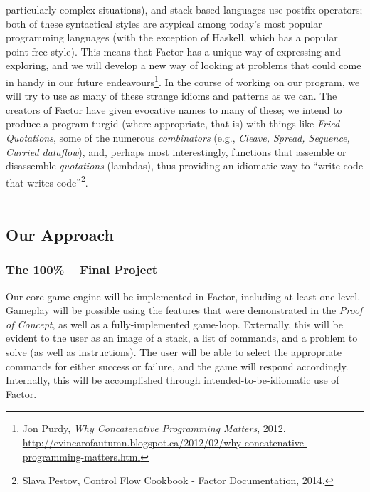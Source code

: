 \documentclass{sig-alternate}
\begin{document}
particularly complex situations), and stack-based languages use
postfix operators; both of these syntactical styles are atypical among
today's most popular programming languages (with the exception of
Haskell, which has a popular point-free style). This means that Factor
has a unique way of expressing and exploring, and we will develop a
new way of looking at problems that could come in handy in our future
endeavours\footnote{Jon Purdy, \textit{Why Concatenative Programming Matters}, 2012. \url{http://evincarofautumn.blogspot.ca/2012/02/why-concatenative-programming-matters.html}}. In the course of working on our program, we will try to
use as many of these strange idioms and patterns as we can. The
creators of Factor have given evocative names to many of these; we
intend to produce a program turgid (where appropriate, that is) with
things like  \textit{Fried Quotations}, some of the numerous
\textit{combinators} (e.g., \textit{Cleave, Spread, Sequence, Curried
dataflow}), and, perhaps most interestingly, functions that assemble
or disassemble \textit{quotations} (lambdas), thus providing an
idiomatic way to ``write code that writes code''\footnote{Slava Pestov, Control Flow Cookbook - Factor Documentation, 2014. 
}.
\\\\
\subsection{Our Approach}
\subsubsection*{The 100\% -- Final Project} 
Our core game engine will be implemented in Factor, including at least one level. Gameplay will be possible using the features that were demonstrated in the \textit{Proof of Concept}, as well as a fully-implemented game-loop. Externally, this will be evident to the user as an image of a stack, a list of commands, and a problem to solve (as well as instructions). The user will be able to select the appropriate commands for either success or failure, and the game will respond accordingly. Internally, this will be accomplished through intended-to-be-idiomatic use of Factor.
\end{document}
